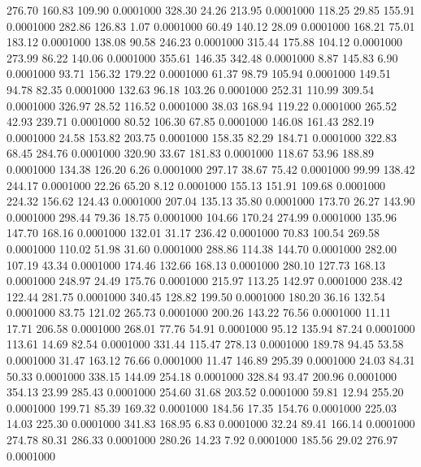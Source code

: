  276.70  160.83  109.90   0.0001000
 328.30   24.26  213.95   0.0001000
 118.25   29.85  155.91   0.0001000
 282.86  126.83    1.07   0.0001000
  60.49  140.12   28.09   0.0001000
 168.21   75.01  183.12   0.0001000
 138.08   90.58  246.23   0.0001000
 315.44  175.88  104.12   0.0001000
 273.99   86.22  140.06   0.0001000
 355.61  146.35  342.48   0.0001000
   8.87  145.83    6.90   0.0001000
  93.71  156.32  179.22   0.0001000
  61.37   98.79  105.94   0.0001000
 149.51   94.78   82.35   0.0001000
 132.63   96.18  103.26   0.0001000
 252.31  110.99  309.54   0.0001000
 326.97   28.52  116.52   0.0001000
  38.03  168.94  119.22   0.0001000
 265.52   42.93  239.71   0.0001000
  80.52  106.30   67.85   0.0001000
 146.08  161.43  282.19   0.0001000
  24.58  153.82  203.75   0.0001000
 158.35   82.29  184.71   0.0001000
 322.83   68.45  284.76   0.0001000
 320.90   33.67  181.83   0.0001000
 118.67   53.96  188.89   0.0001000
 134.38  126.20    6.26   0.0001000
 297.17   38.67   75.42   0.0001000
  99.99  138.42  244.17   0.0001000
  22.26   65.20    8.12   0.0001000
 155.13  151.91  109.68   0.0001000
 224.32  156.62  124.43   0.0001000
 207.04  135.13   35.80   0.0001000
 173.70   26.27  143.90   0.0001000
 298.44   79.36   18.75   0.0001000
 104.66  170.24  274.99   0.0001000
 135.96  147.70  168.16   0.0001000
 132.01   31.17  236.42   0.0001000
  70.83  100.54  269.58   0.0001000
 110.02   51.98   31.60   0.0001000
 288.86  114.38  144.70   0.0001000
 282.00  107.19   43.34   0.0001000
 174.46  132.66  168.13   0.0001000
 280.10  127.73  168.13   0.0001000
 248.97   24.49  175.76   0.0001000
 215.97  113.25  142.97   0.0001000
 238.42  122.44  281.75   0.0001000
 340.45  128.82  199.50   0.0001000
 180.20   36.16  132.54   0.0001000
  83.75  121.02  265.73   0.0001000
 200.26  143.22   76.56   0.0001000
  11.11   17.71  206.58   0.0001000
 268.01   77.76   54.91   0.0001000
  95.12  135.94   87.24   0.0001000
 113.61   14.69   82.54   0.0001000
 331.44  115.47  278.13   0.0001000
 189.78   94.45   53.58   0.0001000
  31.47  163.12   76.66   0.0001000
  11.47  146.89  295.39   0.0001000
  24.03   84.31   50.33   0.0001000
 338.15  144.09  254.18   0.0001000
 328.84   93.47  200.96   0.0001000
 354.13   23.99  285.43   0.0001000
 254.60   31.68  203.52   0.0001000
  59.81   12.94  255.20   0.0001000
 199.71   85.39  169.32   0.0001000
 184.56   17.35  154.76   0.0001000
 225.03   14.03  225.30   0.0001000
 341.83  168.95    6.83   0.0001000
  32.24   89.41  166.14   0.0001000
 274.78   80.31  286.33   0.0001000
 280.26   14.23    7.92   0.0001000
 185.56   29.02  276.97   0.0001000
